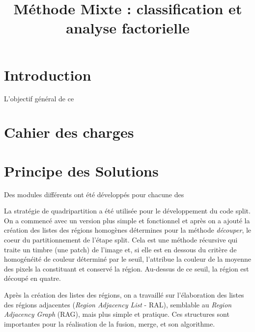 \documentclass{rapportECL}
\title{Méthode Mixte : classification et analyse factorielle} %
\begin{document}




        
\fairemarges %
\fairepagedegarde %
\tabledematieres %



\section{Introduction} 

L'objectif général de ce 

\section{Cahier des charges}

\section{Principe des Solutions}

Des modules différents ont été développés pour chacune des 

La stratégie de quadripartition a été utilisée pour le développement du code split. On a commencé avec un version plus simple et fonctionnel et après on a ajouté la création des listes des régions homogènes détermines pour la méthode \textit{découper}, le coeur du partitionnement de l'étape split. Cela est une méthode récursive qui traite un timbre (une patch) de l'image et, si elle est en dessous du critère de homogénéité de couleur déterminé par le seuil, l'attribue la couleur de la moyenne des pixels la constituant et conservé la région. Au-dessus de ce seuil, la région est découpé en quatre.

Après la création des listes des régions, on a travaillé sur l'élaboration des listes des régions adjacentes (\textit{Region Adjacency List} - RAL), semblable au \textit{Region Adjacency Graph} (RAG), mais plus simple et pratique. Ces structures sont importantes pour la réalisation de la fusion, merge, et son algorithme.
\end{document}
